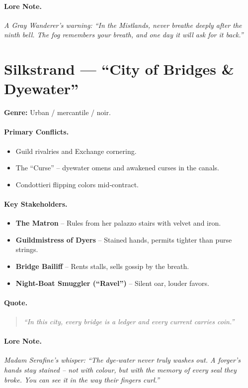 \paragraph{Lore Note.}
\emph{A Gray Wanderer’s warning: “In the Mistlands, never breathe deeply after the ninth bell. The fog remembers your breath, and one day it will ask for it back.”}

\section{Silkstrand — “City of Bridges \& Dyewater”}
\textbf{Genre:} Urban / mercantile / noir.

\paragraph{Primary Conflicts.}
\begin{itemize}
  \item Guild rivalries and Exchange cornering.
  \item The “Curse” – dyewater omens and awakened curses in the canals.
  \item Condottieri flipping colors mid‑contract.
\end{itemize}

\paragraph{Key Stakeholders.}
\begin{itemize}
  \item \textbf{The Matron} – Rules from her palazzo stairs with velvet and iron.
  \item \textbf{Guildmistress of Dyers} – Stained hands, permits tighter than purse strings.
  \item \textbf{Bridge Bailiff} – Rents stalls, sells gossip by the breath.
  \item \textbf{Night-Boat Smuggler (“Ravel”)} – Silent oar, louder favors.
\end{itemize}

\paragraph{Quote.}
\begin{quote}
\emph{“In this city, every bridge is a ledger and every current carries coin.”}
\end{quote}

\paragraph{Lore Note.}
\emph{Madam Serafine’s whisper: “The dye‑water never truly washes out. A forger’s hands stay stained – not with colour, but with the memory of every seal they broke. You can see it in the way their fingers curl.”}

